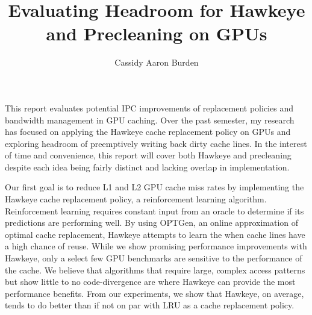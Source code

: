 \documentclass[12pt]{report}	%
\author{Cassidy Aaron Burden}  	%
\title{Evaluating Headroom for Hawkeye and Precleaning on GPUs}
\theoremstyle{definition}
\theoremstyle{remark}
\begin{document}
\copyrightpage          %


%
%
%

\commcertpage           %
\titlepage              %



%




%
\utabstract
{}%
\indent
This report evaluates potential IPC improvements of replacement policies and bandwidth management in GPU caching. Over the past semester, my research has focused on applying the Hawkeye cache replacement policy on GPUs and exploring headroom of preemptively writing back dirty cache lines. In the interest of time and convenience, this report will cover both Hawkeye and precleaning despite each idea being fairly distinct and lacking overlap in implementation.

Our first goal is to reduce L1 and L2 GPU cache miss rates by implementing the Hawkeye cache replacement policy, a reinforcement learning algorithm.  Reinforcement learning requires constant input from an oracle to determine if its predictions are performing well. By using OPTGen, an online approximation of optimal cache replacement, Hawkeye attempts to learn the when cache lines have a high chance of reuse. While we show promising performance improvements with Hawkeye, only a select few GPU benchmarks are sensitive to the performance of the cache. We believe that algorithms that require large, complex access patterns but show little to no code-divergence are where Hawkeye can provide the most performance benefits. From our experiments, we show that Hawkeye, on average, tends to do better than if not on par with LRU as a cache replacement policy.
\end{document}
